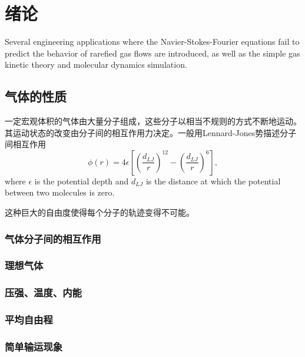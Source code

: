
\chapter{绪论}\label{chap:introduction}

Several engineering applications where the Navier-Stokes-Fourier equations fail to predict the behavior of rarefied gas flows are introduced, as well as the simple gas kinetic theory and molecular dynamics simulation.


\section{气体的性质}


一定宏观体积的气体由大量分子组成，这些分子以相当不规则的方式不断地运动。其运动状态的改变由分子间的相互作用力决定。一般用Lennard-Jones势描述分子间相互作用
\begin{equation}\label{Lennard_Jones_chapter}
\phi(r)=4\epsilon\left[\left(\frac{d_{LJ}}{r}\right)^{12}-\left(\frac{d_{LJ}}{r}\right)^6\right],
\end{equation}
where $\epsilon$ is the potential depth and $d_{LJ}$ is the distance at which the potential between two molecules is zero.

这种巨大的自由度使得每个分子的轨迹变得不可能。



\subsection{气体分子间的相互作用}

\subsection{理想气体}

\subsection{压强、温度、内能}

\subsection{平均自由程}

\subsection{简单输运现象}

\newpage

